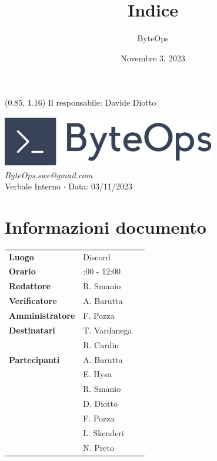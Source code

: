 \documentclass{article}
\title{\textbf{\fontsize{28}{6}\selectfont Indice}}
\author{\fontsize{14}{6}\selectfont ByteOps}
\date{Novembre 3, 2023}
\begin{document}
\begin{textblock*}{\textwidth}(0.85\textwidth, 1.16\textheight)
    Il responsabile: Davide Diotto
\end{textblock*}

\pagestyle{fancy}
\begin{center}
\includegraphics[width = 0.7\textwidth]{../../../Images/logo.png} \\
\vspace{0.2cm}
\textcolor[RGB]{60, 60, 60}{\textit{ByteOps.swe@gmail.com}} \\
\vspace{1cm}
\fontsize{16}{6}\selectfont Verbale Interno $\cdot$ Data: 03/11/2023 \\
\vspace{0.5cm}
\end{center}

\section*{Informazioni documento}
\def\arraystretch{1.2}
\begin{tabular}{>{\raggedleft\arraybackslash}p{}|>{\raggedright\arraybackslash}p{}c}
\hline
\addlinespace
\textbf{Luogo} & Discord \vspace{10pt} \\
\textbf{Orario} & 10:00 - 12:00 \vspace{10pt} \\
\textbf{Redattore} & R. Smanio \vspace{10pt} \\
\textbf{Verificatore} & A. Barutta \vspace{10pt} \\
\textbf{Amministratore} & F. Pozza \vspace{10pt} \\
\textbf{Destinatari} & T. Vardanega \\ & R. Cardin \vspace{10pt} \\
\textbf{Partecipanti} & A. Barutta \\ & E. Hysa \\ & R. Smanio \\ & D. Diotto \\ & F. Pozza \\ & L. Skenderi \\ & N. Preto \vspace{10pt} \\
\end{tabular}
\pagebreak 
\end{document}
